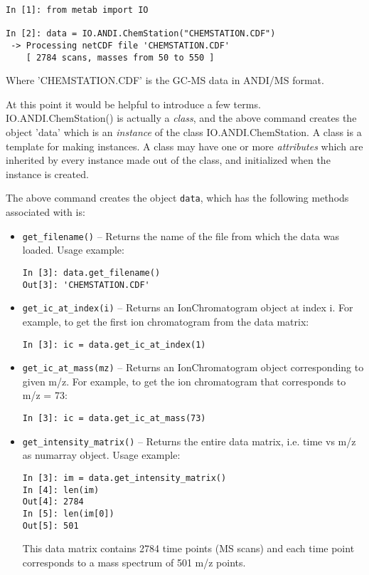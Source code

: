 \begin{verbatim}
In [1]: from metab import IO

In [2]: data = IO.ANDI.ChemStation("CHEMSTATION.CDF")
 -> Processing netCDF file 'CHEMSTATION.CDF'
    [ 2784 scans, masses from 50 to 550 ]
\end{verbatim}

Where 'CHEMSTATION.CDF' is the GC-MS data in ANDI/MS format.

At this point it would be helpful to introduce a few terms.
IO.ANDI.ChemStation() is actually a {\em class}, and the above command
creates the object 'data' which is an {\em instance} of the class
IO.ANDI.ChemStation. A class is a template for making instances.
A class may have one or more {\em attributes} which are inherited
by every instance made out of the class, and initialized when the
instance is created.

The above command creates the object {\tt data}, which has the
following methods associated with is:

\begin{itemize}

\item {\tt get\_filename()} -- Returns the name of the file from which
the data was loaded. Usage example:

\begin{verbatim}
In [3]: data.get_filename()
Out[3]: 'CHEMSTATION.CDF'
\end{verbatim}

\item {\tt get\_ic\_at\_index(i)} -- Returns an IonChromatogram
object at index i. For example, to get the first ion chromatogram
from the data matrix:

\begin{verbatim}
In [3]: ic = data.get_ic_at_index(1)
\end{verbatim}

\item {\tt get\_ic\_at\_mass(mz)} -- Returns an IonChromatogram
object corresponding to given m/z. For example, to get the ion
chromatogram that corresponds to m/z = 73:

\begin{verbatim}
In [3]: ic = data.get_ic_at_mass(73)
\end{verbatim}

\item {\tt get\_intensity\_matrix()} -- Returns the entire data
matrix, i.e. time vs m/z as numarray object. Usage example:

\begin{verbatim}
In [3]: im = data.get_intensity_matrix()
In [4]: len(im)
Out[4]: 2784
In [5]: len(im[0])
Out[5]: 501
\end{verbatim}

This data matrix contains 2784 time points (MS scans) and each time
point corresponds to a mass spectrum of 501 m/z points.

\end{itemize}

